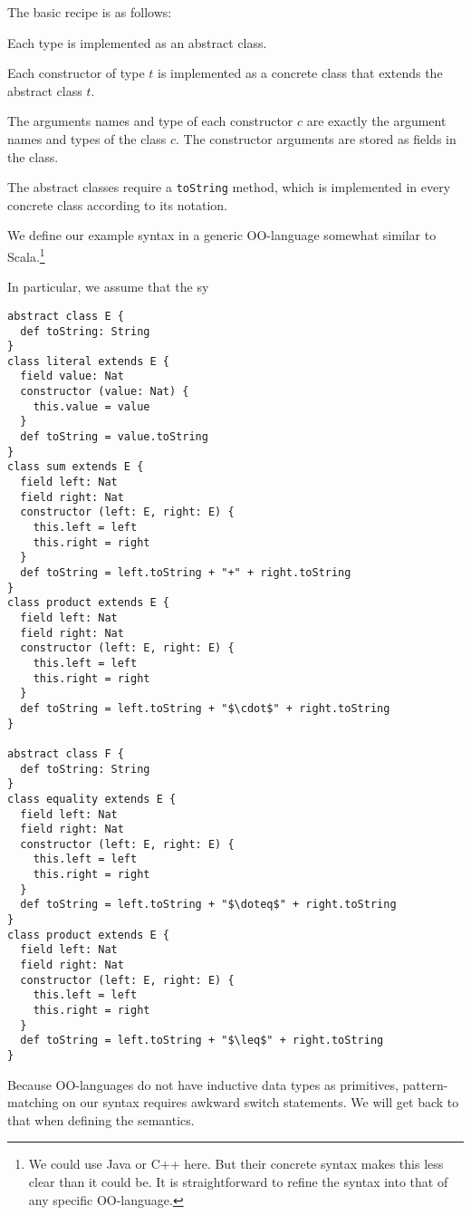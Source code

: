 The basic recipe is as follows:
\begin{compactitem}
\item Each type is implemented as an abstract class.
\item Each constructor of type $t$ is implemented as a concrete class that extends the abstract class $t$.
\item The arguments names and type of each constructor $c$ are exactly the argument names and types of the class $c$.
The constructor arguments are stored as fields in the class.
\item The abstract classes require a \texttt{toString} method, which is implemented in every concrete class according to its notation.
\end{compactitem}


\begin{example}
We define our example syntax in a generic OO-language somewhat similar to Scala.\footnote{We could use Java or C++ here. But their concrete syntax makes this less clear than it could be. It is straightforward to refine the syntax into that of any specific OO-language.}

In particular, we assume that the sy

\begin{lstlisting}
abstract class E {
  def toString: String
}
class literal extends E {
  field value: Nat
  constructor (value: Nat) {
    this.value = value
  }
  def toString = value.toString
}
class sum extends E {
  field left: Nat
  field right: Nat
  constructor (left: E, right: E) {
    this.left = left
    this.right = right
  }
  def toString = left.toString + "+" + right.toString
}
class product extends E {
  field left: Nat
  field right: Nat
  constructor (left: E, right: E) {
    this.left = left
    this.right = right
  }
  def toString = left.toString + "$\cdot$" + right.toString
}

abstract class F {
  def toString: String
}
class equality extends E {
  field left: Nat
  field right: Nat
  constructor (left: E, right: E) {
    this.left = left
    this.right = right
  }
  def toString = left.toString + "$\doteq$" + right.toString
}
class product extends E {
  field left: Nat
  field right: Nat
  constructor (left: E, right: E) {
    this.left = left
    this.right = right
  }
  def toString = left.toString + "$\leq$" + right.toString
}
\end{lstlisting}
\end{example}

Because OO-languages do not have inductive data types as primitives, pattern-matching on our syntax requires awkward switch statements.
We will get back to that when defining the semantics.

